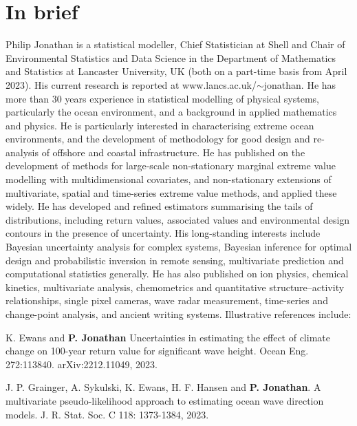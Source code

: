 \documentclass[11pt,a4paper]{moderncv}
\begin{document}
\makecvtitle

\vspace{-30pt}

\section{In brief}

\setlength{\parskip}{0.5em}

Philip Jonathan is a statistical modeller, Chief Statistician at Shell and Chair of Environmental Statistics and Data Science in the Department of Mathematics and Statistics at Lancaster University, UK (both on a part-time basis from April 2023). His current research is reported at www.lancs.ac.uk/$\sim$jonathan. He has more than 30 years experience in statistical modelling of physical systems, particularly the ocean environment, and a background in applied mathematics and physics. He is particularly interested in characterising extreme ocean environments, and the development of methodology for good design and re-analysis of offshore and coastal infrastructure. He has published on the development of methods for large-scale non-stationary marginal extreme value modelling with multidimensional covariates, and non-stationary extensions of multivariate, spatial and time-series extreme value methods, and applied these widely. He has developed and refined estimators summarising the tails of distributions, including return values, associated values and environmental design contours in the presence of uncertainty. His long-standing interests include Bayesian uncertainty analysis for complex systems, Bayesian inference for optimal design and probabilistic inversion in remote sensing, multivariate prediction and computational statistics generally. He has also published on ion physics, chemical kinetics, multivariate analysis, chemometrics and quantitative structure--activity relationships, single pixel cameras, wave radar measurement, time-series and change-point analysis, and ancient writing systems. Illustrative references include:

\setlength{\parskip}{0.2em}

K. Ewans and \textbf{P. Jonathan} Uncertainties in estimating the effect of climate change on 100-year return value for significant wave height. Ocean Eng. 272:113840. arXiv:2212.11049, 2023.

J. P. Grainger, A. Sykulski, K. Ewans, H. F. Hansen and \textbf{P. Jonathan}. A multivariate pseudo-likelihood approach to estimating ocean wave direction models. J. R. Stat. Soc. C 118: 1373-1384, 2023.
\end{document}
